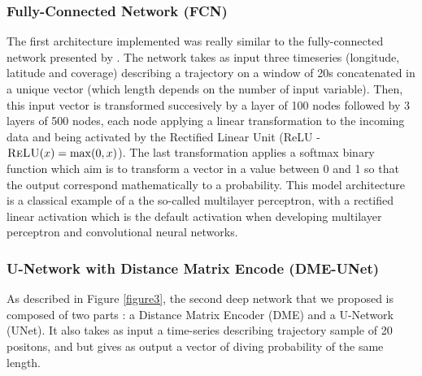 \documentclass{article}
\begin{document}
\subsubsection{Fully-Connected Network (FCN)}
The first architecture implemented was really similar to the fully-connected network presented by \cite{browning_predicting_2018}.
The network takes as input three timeseries (longitude, latitude and coverage) describing a trajectory on a window of 20s concatenated in a unique vector (which length depends on the number of input variable).
Then, this input vector is transformed succesively by a layer of 100 nodes followed by 3 layers of 500 nodes, each node applying a linear transformation to the incoming data and being activated by the Rectified Linear Unit (ReLU - $\textsc{ReLU}(x) = \max(0,x)$). The last transformation applies a softmax binary function which aim is to transform a vector in a value between 0 and 1 so that the output correspond mathematically to a probability.
This model architecture is a classical example of a the so-called multilayer perceptron, with a rectified linear activation which is the default activation when developing multilayer perceptron and convolutional neural networks.

\subsubsection{U-Network with Distance Matrix Encode (DME-UNet)}
As described in Figure \ref{figure3}, the second deep network that we proposed is composed of two parts : a Distance Matrix Encoder (DME) and a U-Network (UNet).
It also takes as input a time-series describing trajectory sample of 20 positons, and but gives as output a vector of diving probability of the same length.
\end{document}
